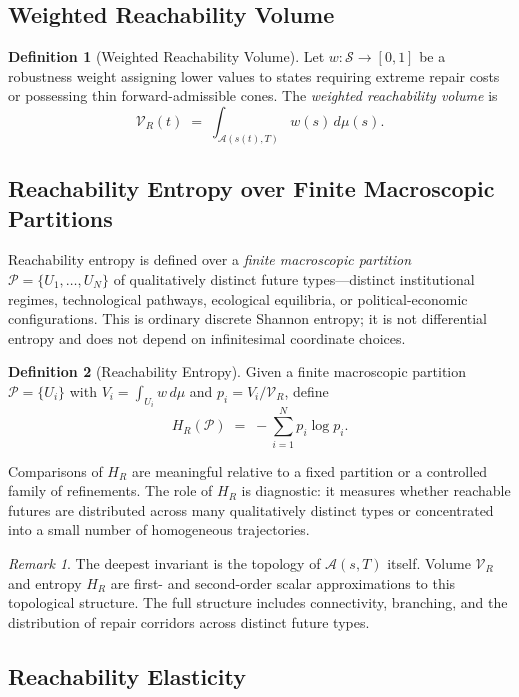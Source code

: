 \documentclass[12pt, a4paper]{article}
\theoremstyle{plain}
\theoremstyle{definition}
\newtheorem{definition}{Definition}
\theoremstyle{remark}
\newtheorem{remark}{Remark}
\begin{document}
\subsection{Weighted Reachability Volume}

\begin{definition}[Weighted Reachability Volume]
Let $w : \mathcal{S} \to [0,1]$ be a robustness weight assigning lower values to states requiring extreme repair costs or possessing thin forward-admissible cones. The \emph{weighted reachability volume} is
\[
\mathcal{V}_R(t) \;=\; \int_{\mathcal{A}(s(t),T)} w(s)\, d\mu(s).
\]
\end{definition}

\subsection{Reachability Entropy over Finite Macroscopic Partitions}

Reachability entropy is defined over a \emph{finite macroscopic partition} $\mathcal{P} = \{U_1, \ldots, U_N\}$ of qualitatively distinct future types---distinct institutional regimes, technological pathways, ecological equilibria, or political-economic configurations. This is ordinary discrete Shannon entropy; it is not differential entropy and does not depend on infinitesimal coordinate choices.

\begin{definition}[Reachability Entropy]
Given a finite macroscopic partition $\mathcal{P} = \{U_i\}$ with $V_i = \int_{U_i} w\, d\mu$ and $p_i = V_i/\mathcal{V}_R$, define
\[
H_R(\mathcal{P}) \;=\; -\sum_{i=1}^N p_i \log p_i.
\]
\end{definition}

Comparisons of $H_R$ are meaningful relative to a fixed partition or a controlled family of refinements. The role of $H_R$ is diagnostic: it measures whether reachable futures are distributed across many qualitatively distinct types or concentrated into a small number of homogeneous trajectories.

\begin{remark}
The deepest invariant is the topology of $\mathcal{A}(s,T)$ itself. Volume $\mathcal{V}_R$ and entropy $H_R$ are first- and second-order scalar approximations to this topological structure. The full structure includes connectivity, branching, and the distribution of repair corridors across distinct future types.
\end{remark}

\subsection{Reachability Elasticity}
\end{document}
